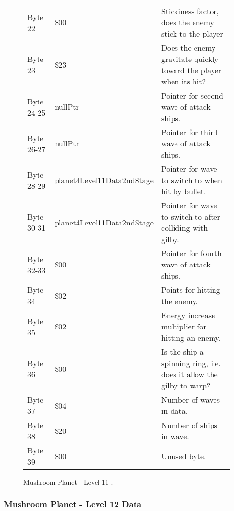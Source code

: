 \begin{figure}[H]
{\begin{adjustbox}{width=12cm}
\begin{tabular}{lll}
 Byte 22    & \$00                        & Stickiness factor, does the enemy stick to the player               \\
 Byte 23    & \$23                        & Does the enemy gravitate quickly toward the player when its hit?    \\
 Byte 24-25 & nullPtr                    & Pointer for second wave of attack ships.                            \\
 Byte 26-27 & nullPtr                    & Pointer for third wave of attack ships.                             \\
 Byte 28-29 & planet4Level11Data2ndStage & Pointer for wave to switch to when hit by bullet.                   \\
 Byte 30-31 & planet4Level11Data2ndStage & Pointer for  wave to switch to after colliding with gilby.          \\
 Byte 32-33 & \$00                        & Pointer for fourth wave of attack ships.                            \\
 Byte 34    & \$02                        & Points for hitting the enemy.                                       \\
 Byte 35    & \$02                        & Energy increase multiplier for hitting an enemy.                    \\
 Byte 36    & \$00                        & Is the ship a spinning ring, i.e. does it allow the gilby to warp?  \\
 Byte 37    & \$04                        & Number of waves in data.                                            \\
 Byte 38    & \$20                        & Number of ships in wave.                                            \\
 Byte 39    & \$00                        & Unused byte.                                                        \\
\bottomrule
\end{tabular}

  \end{adjustbox}

  }\caption*{Mushroom Planet - Level 11
.}
\end{figure}

\clearpage
\subsubsection{Mushroom Planet - Level 12 Data}

